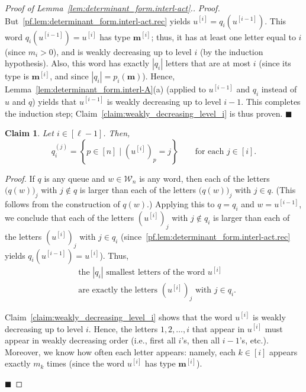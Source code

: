 \documentclass[reqno]{amsart}
\newcommand{\0}{\phantom{c}}
\newcommand{\mm}{\mathbf{m}}
\newcommand{\mcW}{\mathcal{W}}
\newenvironment{subproof}{\textit{Proof.} }{\hfill$\blacksquare$ \medskip}
\newcommand{\set}[1]{\left\{ #1 \right\}}
\newcommand{\abs}[1]{\left| #1 \right|}
\newcommand{\tup}[1]{\left( #1 \right)}
\newcommand{\ive}[1]{\left[ #1 \right]}
\theoremstyle{plain}
\newtheorem{claim}[thm]{Claim}
\theoremstyle{definition}
\numberwithin{equation}{section}
\begin{document}
\begin{proof}[Proof of Lemma~\ref{lem:determinant_form.interl-act}.]
\begin{subproof}
But~\eqref{pf.lem:determinant_form.interl-act.rec} yields $u^{\left[  i\right]} = q_i( u^{\left[  i-1\right]} )$.
This word $q_i( u^{\left[  i-1\right]} ) = u^{\left[  i\right]}$ has type $\mm^{[i]}$; thus, it has at least one letter equal to $i$ (since $m_i > 0$), and is weakly decreasing up to level $i$ (by the induction hypothesis).
Also, this word has exactly $\abs{q_i}$ letters that are at most $i$ (since its type is $\mm^{[i]}$, and since $\abs{q_i} = p_i(\mm)$).
Hence, Lemma~\ref{lem:determinant_form.interl-A}(a) (applied to $u^{\left[i-1\right]}$ and $q_i$ instead of $u$ and $q$)
yields that $u^{\left[i-1\right]}$ is weakly decreasing up to level $i-1$.
This completes the induction step; Claim~\ref{claim:weakly_decreasing_level_i} is thus proven.
\end{subproof}

\begin{claim}
\label{claim:description_q_i^(j)}
Let $i\in \ive{\ell-1}$. Then,
\[
q_i^{(j)} = \set{ p \in \ive{n} \mid \left( u^{\left[  i\right] } \right)_p = j }
\qquad \text{for each } j \in \ive{i} .
\]
\end{claim}

\begin{subproof}
If $q$ is any queue and $w \in \mcW_n$ is any word, then each of the letters $\bigl( q(w) \bigr)_j$ with $j \notin q$ is larger than each of the letters $\bigl( q(w) \bigr)_j$ with $j \in q$.
(This follows from the construction of $q(w)$.)
Applying this to $q = q_i$ and $w = u^{\left[i-1\right]}$, we conclude that
each of the letters $(u^{\left[  i\right]})_j$ with $j \notin q_i$ is larger than each of the letters $(u^{\left[  i\right]})_j$ with $j \in q_i$
(since~\eqref{pf.lem:determinant_form.interl-act.rec} yields $q_i( u^{\left[  i-1\right]} ) = u^{\left[  i\right]}$).
Thus,
\begin{equation}
\label{pf.claim:description_q_i^(j).1}
\begin{split}
&\text{the $\abs{q_i}$ smallest letters of the word $u^{\left[  i\right]}$} \\
&\text{are exactly the letters $(u^{\left[  i\right]})_j$ with $j \in q_i$} .
\end{split}
\end{equation}

Claim~\ref{claim:weakly_decreasing_level_i} shows that the word $u^{\left[  i\right]  }$ is weakly decreasing up to level $i$.
Hence, the letters $1,2,\dotsc,i$ that appear in $u^{\left[  i\right]  }$ must appear in weakly decreasing order (i.e., first all $i$'s, then all $i-1$'s, etc.).
Moreover, we know how often each letter appears: namely, each $k \in \ive{i}$ appears exactly $m_k$ times (since the word $u^{\left[  i\right]  }$ has type $\mm^{[i]}$).


\end{subproof}
\end{proof}
\end{document}
